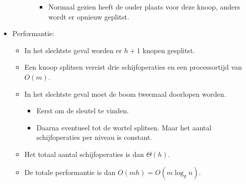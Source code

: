 \begin{itemize}
\begin{itemize}
\begin{itemize}
\begin{itemize}
                \item Normaal gezien heeft de ouder plaats voor deze knoop, anders wordt er opnieuw geplitst.
            \end{itemize}
        \end{itemize}
    \end{itemize}
    \item Performantie:
    \begin{itemize}
        \item In het slechtste geval worden er $h + 1$ knopen gesplitst. 
        \item Een knoop splitsen vereist drie schijfoperaties en een processortijd van $O(m)$.
        \item In het slechtste geval moet de boom tweemaal doorlopen worden.
        \begin{itemize}
            \item Eerst om de sleutel te vinden.
            \item Daarna eventueel tot de wortel splitsen.
            \good Maar het aantal schijfoperaties per niveau is constant.
        \end{itemize}
        \item Het totaal aantal schijfoperaties is dan $\Theta(h)$.
        \item De totale performantie is dan $O(mh) = O(m \log_g n)$.
    \end{itemize}
   
\end{itemize}

